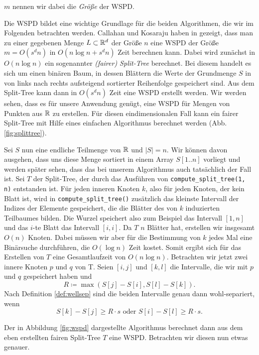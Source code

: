 \noindent $m$ nennen wir dabei die \emph{Größe} der WSPD.

Die WSPD bildet eine wichtige Grundlage für die beiden Algorithmen, die wir im Folgenden betrachten werden. 
Callahan und Kosaraju haben in \cite{callahan} gezeigt, dass man zu einer gegebenen Menge $L \subset \mathbb{R}^d$ der Größe $n$ eine WSPD  der Größe $m = O(s^dn)$ in $O(n\log n + s^dn)$ Zeit berechnen kann. 
Dabei wird zunächst in $O(n \log n)$ ein sogenannter \emph{(fairer) Split-Tree} berechnet. 
Bei diesem handelt es sich um einen binären Baum, in dessen Blättern die Werte der Grundmenge $S$ in von links nach rechts aufsteigend sortierter Reihenfolge gespeichert sind. 
Aus dem Split-Tree kann dann in $O(s^dn)$ Zeit eine WSPD erstellt werden. 
Wir werden sehen, dass es für unsere Anwendung genügt, eine WSPD für Mengen von Punkten aus $\mathbb{R}$ zu erstellen. 
Für diesen eindimensionalen Fall kann ein fairer Split-Tree mit Hilfe eines einfachen Algorithmus berechnet werden (Abb. \ref{fig:splittree}).



Sei $S$ nun eine endliche Teilmenge von $\mathbb{R}$ und $|S| = n$. 
Wir können davon ausgehen, dass uns diese Menge sortiert in einem Array $S[1..n]$ vorliegt und werden später sehen, dass das bei unserem Algorithmus auch tatsächlich der Fall ist. 
Sei $T$ der Split-Tree, der durch das Ausführen von \texttt{compute\_split\_tree(1, n)} entstanden ist.
Für jeden inneren Knoten $k$, also für jeden Knoten, der kein Blatt ist, wird in \texttt{compute\_split\_tree()} zusätzlich das kleinste Intervall der Indizes der Elemente gespeichert, die die Blätter des von $k$ induzierten Teilbaumes bilden.
Die Wurzel speichert also zum Beispiel das Intervall $[1, n]$ und das $i$-te Blatt das Intervall $[i, i]$.
Da $T$ $n$ Blätter hat, erstellen wir insgesamt $O(n)$ Knoten. 
Dabei müssen wir aber für die Bestimmung von $k$ jedes Mal eine Binärsuche durchführen, die $O(\log n)$ Zeit kostet. 
Somit ergibt sich für das Erstellen von $T$ eine Gesamtlaufzeit von $O(n\log n)$.
Betrachten wir jetzt zwei innere Knoten $p$ und $q$ von T. Seien $[i, j]$ und $[k, l]$ die Intervalle, die wir mit $p$ und $q$ gespeichert haben und 
\[
R \coloneqq \max(S[j] - S[i], S[l] - S[k]).
\]
Nach Definition \ref{def:wellsep} sind die beiden Intervalle genau dann wohl-separiert, wenn 
\[
S[k] - S[j] \geq R \cdot s \text{ oder } S[i] - S[l] \geq R \cdot s.
\]



Der in Abbildung \ref{fig:wspd} dargestellte Algorithmus berechnet dann aus dem eben erstellten fairen Split-Tree $T$ eine WSPD.
Betrachten wir diesen nun etwas genauer.
 
